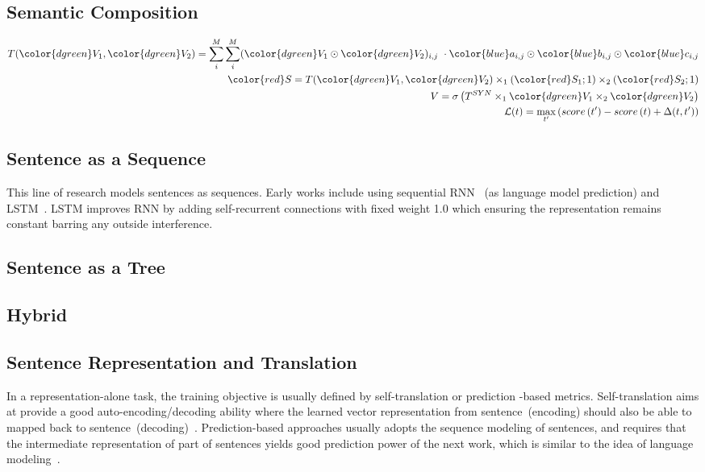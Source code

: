 \documentclass{article} %
\begin{document}
\subsection{Semantic Composition}
\begin{eqnarray}
T({\color{dgreen} V_1}, {\color{dgreen} V_2}) =  \sum\limits_{i}^{M}\sum\limits_{i}^{M}
({\color{dgreen} V_1} \odot {\color{dgreen} V_2})_{i,j}~ \cdot {\color{blue} a_{i,j} } \odot
{\color{blue} b_{i,j} } \odot  {\color{blue} c_{i,j}} \nonumber \\
{\color{red} S} = T({\color{dgreen} V_1}, {\color{dgreen} V_2})
\times_1 ({\color{red} S_1}; 1) \times_2 ({\color{red} S_2}; 1) \nonumber \\
V = \sigma\left( T^{SYN} \times_1 {\color{dgreen} V_1} \times_2 {\color{dgreen} V_2} \right) \nonumber \\
\mathcal{L}(t) = \max_{t'} \left(score\left(t'\right) - score\left(t\right) + \Delta(t, t')
\right)
\end{eqnarray}


\iffalse
\subsection{Sentence as a Sequence}
This line of research models sentences as sequences. Early works include
using sequential RNN~\cite{mikolov2010recurrent, mikolov2012context} (as
language model prediction) and LSTM~\cite{sutskever2014sequence}.
LSTM improves RNN by adding self-recurrent connections with fixed weight
1.0 which ensuring the representation remains constant barring any outside
interference.

\subsection{Sentence as a Tree}
\subsection{Hybrid}
\subsection{Sentence Representation and Translation}
In a representation-alone task, the training objective is usually defined by
self-translation or prediction -based metrics. Self-translation aims at provide
a good auto-encoding/decoding ability where the learned vector representation
from sentence~(encoding) should also be able to mapped back to
sentence~(decoding)~\cite{socher2011dynamic}. Prediction-based approaches
usually adopts the sequence modeling of sentences, and requires that the
intermediate representation of part of sentences yields good prediction power
of the next work, which is similar to the idea of language
modeling~\cite{mikolov2013distributed}.
\end{document}
